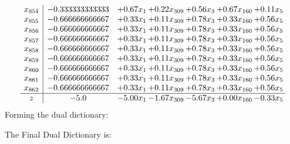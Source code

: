 \documentclass[8pt]{article}
\begin{document}
\[\begin{array}{c| c c@{\hskip 2pt} c@{\hskip 2pt} c@{\hskip 2pt} c@{\hskip 2pt} c@{\hskip 2pt} }
 x_{854}   &  -0.333333333333 & +  0.67 x_{1} & +  0.22 x_{309} & +  0.56 x_{3} & +  0.67 x_{160} & +  0.11 x_{5}\\
 x_{855}   &  -0.666666666667 & +  0.33 x_{1} & +  0.11 x_{309} & +  0.78 x_{3} & +  0.33 x_{160} & +  0.56 x_{5}\\
 x_{856}   &  -0.666666666667 & +  0.33 x_{1} & +  0.11 x_{309} & +  0.78 x_{3} & +  0.33 x_{160} & +  0.56 x_{5}\\
 x_{857}   &  -0.666666666667 & +  0.33 x_{1} & +  0.11 x_{309} & +  0.78 x_{3} & +  0.33 x_{160} & +  0.56 x_{5}\\
 x_{858}   &  -0.666666666667 & +  0.33 x_{1} & +  0.11 x_{309} & +  0.78 x_{3} & +  0.33 x_{160} & +  0.56 x_{5}\\
 x_{859}   &  -0.666666666667 & +  0.33 x_{1} & +  0.11 x_{309} & +  0.78 x_{3} & +  0.33 x_{160} & +  0.56 x_{5}\\
 x_{860}   &  -0.666666666667 & +  0.33 x_{1} & +  0.11 x_{309} & +  0.78 x_{3} & +  0.33 x_{160} & +  0.56 x_{5}\\
 x_{861}   &  -0.666666666667 & +  0.33 x_{1} & +  0.11 x_{309} & +  0.78 x_{3} & +  0.33 x_{160} & +  0.56 x_{5}\\
 x_{862}   &  -0.666666666667 & +  0.33 x_{1} & +  0.11 x_{309} & +  0.78 x_{3} & +  0.33 x_{160} & +  0.56 x_{5}\\
\hline
z    &  -5.0 & -5.00 x_{1} & -1.67 x_{309} & -5.67 x_{3} & +  0.00 x_{160} & -0.33 x_{5}\\
\end{array}\]
Forming the dual dictionary:

The Final Dual Dictionary is: 
\end{document}
